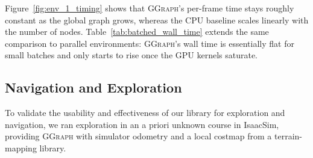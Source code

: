 \documentclass{article}
\newcommand{\sysname}{\textcolor{ggcolor}{\textsc{GGraph}}\xspace}
\begin{document}
Figure~\ref{fig:env_1_timing} shows that \sysname's per-frame time stays roughly constant as the global graph grows, whereas the CPU baseline scales linearly with the number of nodes. Table~\ref{tab:batched_wall_time} extends the same comparison to parallel environments: \sysname's wall time is essentially flat for small batches and only starts to rise once the GPU kernels saturate.

\subsection{Navigation and Exploration}
To validate the usability and effectiveness of our library for exploration and navigation, we ran exploration in an a priori unknown course in IsaacSim, providing \sysname with simulator odometry and a local costmap from a terrain-mapping library.
\end{document}
